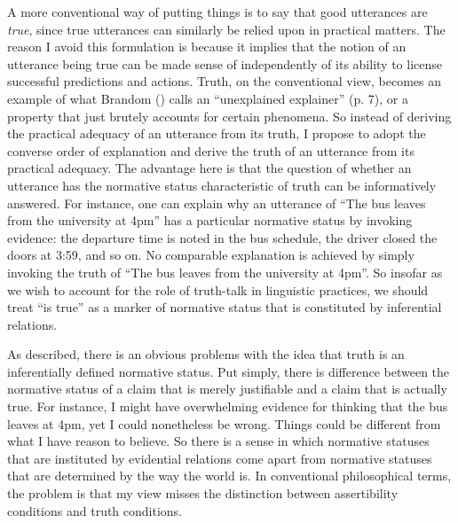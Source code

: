 A more conventional way of putting things is to say that good utterances are \textit{true}, since true utterances can similarly be relied upon in practical matters. The reason I avoid this formulation is because it implies that the notion of an utterance being true can be made sense of independently of its ability to license successful predictions and actions. Truth, on the conventional view, becomes an example of what Brandom (\citeyear{Brandom:1994}) calls an ``unexplained explainer'' (p. 7), or a property that just brutely accounts for certain phenomena. So instead of deriving the practical adequacy of an utterance from its truth, I propose to adopt the converse order of explanation and derive the truth of an utterance from its practical adequacy. The advantage here is that the question of whether an utterance has the normative status characteristic of truth can be informatively answered. For instance, one can explain why an utterance of ``The bus leaves from the university at 4pm'' has a particular normative status by invoking evidence: the departure time is noted in the bus schedule, the driver closed the doors at 3:59, and so on. No comparable explanation is achieved by simply invoking the truth of ``The bus leaves from the university at 4pm''. So insofar as we wish to account for the role of truth-talk in linguistic practices, we should treat ``is true'' as a marker of normative status that is constituted by inferential relations.

As described, there is an obvious problems with the idea that truth is an inferentially defined normative status. Put simply, there is difference between the normative status of a claim that is merely justifiable and a claim that is actually true. For instance, I might have overwhelming evidence for thinking that the bus leaves at 4pm, yet I could nonetheless be wrong. Things could be different from what I have reason to believe. So there is a sense in which normative statuses that are instituted by evidential relations come apart from normative statuses that are determined by the way the world is. In conventional philosophical terms, the problem is that my view misses the distinction between assertibility conditions and truth conditions.

